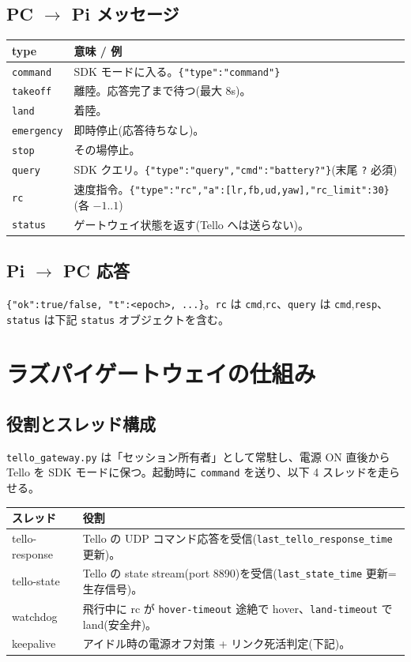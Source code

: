 \documentclass[11pt,a4paper]{ltjsarticle}
\newcommand{\code}[1]{\texttt{\small #1}}
\begin{document}
\subsection{PC $\to$ Pi メッセージ}
\begin{longtable}{@{}p{3.4cm}p{11.6cm}@{}}
\toprule
\textbf{type} & \textbf{意味 / 例} \\
\midrule
\endhead
\code{command} & SDK モードに入る。\code{\{"type":"command"\}} \\
\code{takeoff} & 離陸。応答完了まで待つ(最大 8s)。\\
\code{land} & 着陸。\\
\code{emergency} & 即時停止(応答待ちなし)。\\
\code{stop} & その場停止。\\
\code{query} & SDK クエリ。\code{\{"type":"query","cmd":"battery?"\}}(末尾 \code{?} 必須)\\
\code{rc} & 速度指令。\code{\{"type":"rc","a":[lr,fb,ud,yaw],"rc\_limit":30\}}(各 $-1..1$)\\
\code{status} & ゲートウェイ状態を返す(Tello へは送らない)。\\
\bottomrule
\end{longtable}

\subsection{Pi $\to$ PC 応答}
\code{\{"ok":true/false, "t":<epoch>, ...\}}。\code{rc} は \code{cmd},\code{rc}、\code{query} は
\code{cmd},\code{resp}、\code{status} は下記 \code{status} オブジェクトを含む。

\section{ラズパイゲートウェイの仕組み}

\subsection{役割とスレッド構成}
\code{tello\_gateway.py} は「セッション所有者」として常駐し、電源 ON 直後から Tello を
SDK モードに保つ。起動時に \code{command} を送り、以下 4 スレッドを走らせる。

\begin{longtable}{@{}p{3.6cm}p{11.4cm}@{}}
\toprule
\textbf{スレッド} & \textbf{役割} \\
\midrule
\endhead
tello-response & Tello の UDP コマンド応答を受信(\code{last\_tello\_response\_time} 更新)。\\
tello-state & Tello の state stream(port 8890)を受信(\code{last\_state\_time} 更新=生存信号)。\\
watchdog & 飛行中に rc が \code{hover-timeout} 途絶で hover、\code{land-timeout} で land(安全弁)。\\
keepalive & アイドル時の電源オフ対策 + リンク死活判定(下記)。\\
\bottomrule
\end{longtable}
\end{document}
